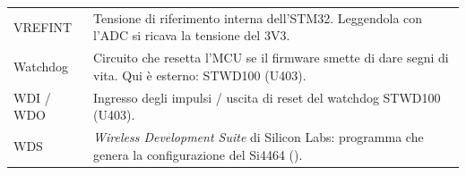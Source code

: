 \begin{xltabular}{\linewidth}{@{}L{26mm}Y@{}}
VREFINT & Tensione di riferimento interna dell'STM32. Leggendola con l'ADC si ricava la tensione del 3V3.\\
Watchdog & Circuito che resetta l'MCU se il firmware smette di dare segni di vita. Qui è esterno: STWD100 (U403).\\
WDI / WDO & Ingresso degli impulsi / uscita di reset del watchdog STWD100 (U403).\\
WDS & \emph{Wireless Development Suite} di Silicon Labs: programma che genera la configurazione del Si4464 ().\\
\bottomrule
\end{xltabular}
